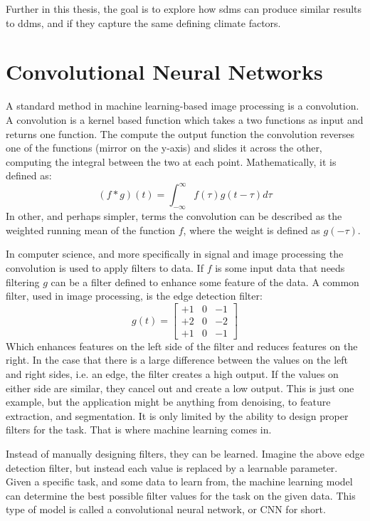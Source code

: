 Further in this thesis, the goal is to explore how \glspl{sdm} can produce similar results to \glspl{ddm}, and if they capture the same defining climate factors.

\section{Convolutional Neural Networks}

A standard method in machine learning-based image processing is a convolution. A convolution is a kernel based function which takes a two functions as input and returns one function. The compute the output function the convolution reverses one of the functions (mirror on the y-axis) and slides it across the other, computing the integral between the two at each point. Mathematically, it is defined as:
\begin{equation}
    (f * g)(t) = \int_{-\infty}^{\infty}f(\tau)g(t-\tau)d\tau
\end{equation}
In other, and perhaps simpler, terms the convolution can be described as the weighted running mean of the function $f$, where the weight is defined as $g(-\tau)$.

In computer science, and more specifically in signal and image processing the convolution is used to apply filters to data. If $f$ is some input data that needs filtering $g$ can be a filter defined to enhance some feature of the data. A common filter, used in image processing, is the edge detection filter:
\begin{equation}
    g(t) = 
    \begin{bmatrix}
        +1 & 0 & -1 \\
        +2 & 0 & -2 \\
        +1 & 0 & -1
    \end{bmatrix}
\end{equation}
Which enhances features on the left side of the filter and reduces features on the right. In the case that there is a large difference between the values on the left and right sides, i.e. an edge, the filter creates a high output. If the values on either side are similar, they cancel out and create a low output. This is just one example, but the application might be anything from denoising, to feature extraction, and segmentation. It is only limited by the ability to design proper filters for the task. That is where machine learning comes in.

Instead of manually designing filters, they can be learned. Imagine the above edge detection filter, but instead each value is replaced by a learnable parameter. Given a specific task, and some data to learn from, the machine learning model can determine the best possible filter values for the task on the given data. This type of model is called a convolutional neural network, or CNN for short.


